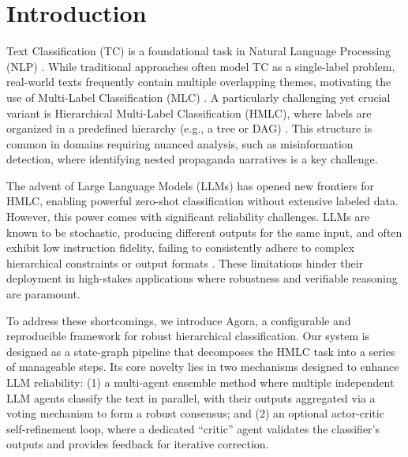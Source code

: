 \section{Introduction}

Text Classification (TC) is a foundational task in Natural Language Processing (NLP) \citep{Zangari2024}. While traditional approaches often model TC as a single-label problem, real-world texts frequently contain multiple overlapping themes, motivating the use of Multi-Label Classification (MLC) \citep{Hu2025,TidakeSane2018}. A particularly challenging yet crucial variant is Hierarchical Multi-Label Classification (HMLC), where labels are organized in a predefined hierarchy (e.g., a tree or DAG) \citep{liu2023recentadvanceshierarchicalmultilabel}. This structure is common in domains requiring nuanced analysis, such as misinformation detection, where identifying nested propaganda narratives is a key challenge.

The advent of Large Language Models (LLMs) has opened new frontiers for HMLC, enabling powerful zero-shot classification without extensive labeled data. However, this power comes with significant reliability challenges. LLMs are known to be stochastic, producing different outputs for the same input, and often exhibit low instruction fidelity, failing to consistently adhere to complex hierarchical constraints or output formats \citep{some_citation_on_llm_brittleness}. These limitations hinder their deployment in high-stakes applications where robustness and verifiable reasoning are paramount.

To address these shortcomings, we introduce Agora, a configurable and reproducible framework for robust hierarchical classification. Our system is designed as a state-graph pipeline that decomposes the HMLC task into a series of manageable steps. Its core novelty lies in two mechanisms designed to enhance LLM reliability: (1) a multi-agent ensemble method where multiple independent LLM agents classify the text in parallel, with their outputs aggregated via a voting mechanism to form a robust consensus; and (2) an optional actor-critic self-refinement loop, where a dedicated ``critic'' agent validates the classifier's outputs and provides feedback for iterative correction.
